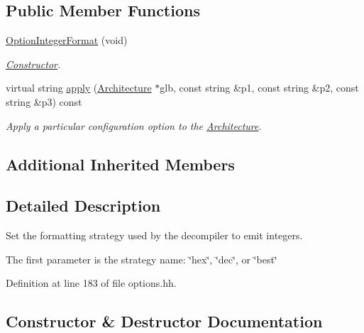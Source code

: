 \subsection*{Public Member Functions}
\begin{DoxyCompactItemize}
\item 
\mbox{\hyperlink{class_option_integer_format_ab14450a704c42a792bd7f87b5ab245ff}{Option\+Integer\+Format}} (void)
\begin{DoxyCompactList}\small\item\em \mbox{\hyperlink{class_constructor}{Constructor}}. \end{DoxyCompactList}\item 
virtual string \mbox{\hyperlink{class_option_integer_format_a96f055544f7ea5a765906481a0880b4f}{apply}} (\mbox{\hyperlink{class_architecture}{Architecture}} $\ast$glb, const string \&p1, const string \&p2, const string \&p3) const
\begin{DoxyCompactList}\small\item\em Apply a particular configuration option to the \mbox{\hyperlink{class_architecture}{Architecture}}. \end{DoxyCompactList}\end{DoxyCompactItemize}
\subsection*{Additional Inherited Members}


\subsection{Detailed Description}
Set the formatting strategy used by the decompiler to emit integers. 

The first parameter is the strategy name\+: \char`\"{}hex\char`\"{}, \char`\"{}dec\char`\"{}, or \char`\"{}best\char`\"{} 

Definition at line 183 of file options.\+hh.



\subsection{Constructor \& Destructor Documentation}
\mbox{\label{class_option_integer_format_ab14450a704c42a792bd7f87b5ab245ff}} 
